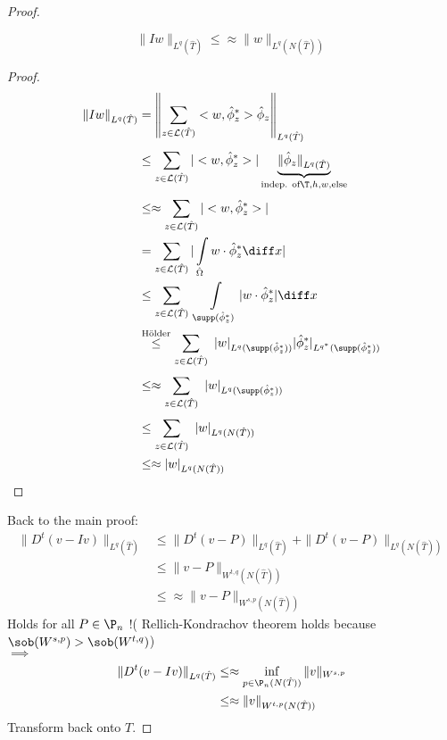 \begin{proof}
\begin{itemize}
\begin{lemma}
\begin{equation*}
				\|Iw\|_{L^{q}(\hat{T})} \leq \approx \|w\|_{L^{q}(N(\hat{T}))}
			\end{equation*}
		\end{lemma}
		\begin{proof}
			\begin{align*}
				\|Iw\|_{L^{q}(\hat{T})} &= \left\|\sum\limits_{z \in\mathcal{L}(\hat{T})}^{} <w,\hat{\phi}_{z}^*>\hat{\phi}_{z}\right\|_{L^{q}(\hat{T})}\\
										&\leq \sum\limits_{z \in\mathcal{L}(\hat{T})}^{} |<w,\hat{\phi}_{z}^*>| \underbrace{\|\hat{\phi}_{z}\|_{L^{q}(\hat{T})}}_{\text{indep. of} \T,h,w,\text{else}}\\
										&\leq\approx \sum\limits_{z \in\mathcal{L}(\hat{T})}^{} |<w,\hat{\phi}_{z}^*>|\\
										&= \sum\limits_{z \in\mathcal{L}(\hat{T})}^{} |\int\limits_{\hat{\Omega}}w\cdot\hat{\phi}_{z}^*\diff x |\\
										&\leq \sum\limits_{z \in\mathcal{L}(\hat{T})}^{} \  \int\limits_{\supp(\hat{\phi}_{z}^*)} |w \cdot \hat{\phi}_{z}^*|\diff x \\
										&\overset{\text{Hölder}}{\leq} \sum\limits_{z \in\mathcal{L}(\hat{T})}^{} \ |w|_{L^q(\supp(\hat{\phi}_{z}^*))} |\hat{\phi}_{z}^*|_{L^{q^*}(\supp(\hat{\phi}_{z}^*))}\\
										&\leq\approx \sum\limits_{z \in\mathcal{L}(\hat{T})}^{} \ |w|_{L^q(\supp(\hat{\phi}_{z}^*))} \\
										&\leq \sum\limits_{z \in\mathcal{L}(\hat{T})}^{} \ |w|_{L^q(N(\hat{T}))} \\
										&\leq\approx |w|_{L^q(N(\hat{T}))} 
			\end{align*}
		\end{proof}
	\end{itemize}
	Back to the main proof:
	\begin{align*}
		\|D^t(v-Iv)\|_{L^{q}(\hat{T})} &\leq \|D^t(v-P)\|_{L^{q}(\hat{T})} + \|D^t(v-P)\|_{L^{q}(N(\hat{T}))}\\
									   &\leq \|v-P\|_{W^{t,q}(N(\hat{T}))}\\
									   &\leq\approx \|v-P\|_{W^{s,p}(N(\hat{T}))}
	\end{align*}
	Holds for all $P \in \P_{n}$ !( Rellich-Kondrachov theorem holds because\\ $\sob(W^{s,p})>\sob(W^{t,q})$)\\
	$\implies$ 
	\begin{align*}
		\|D^t(v-Iv)\|_{L^{q}(\hat{T})} &\leq\approx \inf_{p \in \P_{n}(N(\hat{T}))} \|v\|_{W^{s,p}} \\
									   &\leq\approx \|v\|_{W^{t,p}(N(\hat{T}))}
	\end{align*}
	Transform back onto $T$.
\end{proof}


